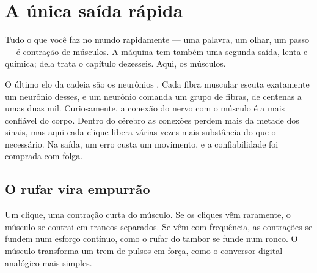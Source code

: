 \chapter{A única saída rápida}

Tudo o que você faz no mundo rapidamente --- uma palavra, um olhar, um passo --- é contração de músculos. A máquina tem também uma segunda saída, lenta e química; dela trata o capítulo dezesseis. Aqui, os músculos.

O último elo da cadeia são os neurônios . Cada fibra muscular escuta exatamente um neurônio desses, e um neurônio comanda um grupo de fibras, de centenas a umas duas mil. Curiosamente, a conexão do nervo com o músculo é a mais confiável do corpo. Dentro do cérebro as conexões perdem mais da metade dos sinais, mas aqui cada clique libera várias vezes mais substância do que o necessário. Na saída, um erro custa um movimento, e a confiabilidade foi comprada com folga.

\section*{O rufar vira empurrão}

Um clique, uma contração curta do músculo. Se os cliques vêm raramente, o músculo se contrai em trancos separados. Se vêm com frequência, as contrações se fundem num esforço contínuo, como o rufar do tambor se funde num ronco. O músculo transforma um trem de pulsos em força, como o conversor digital-analógico mais simples.


